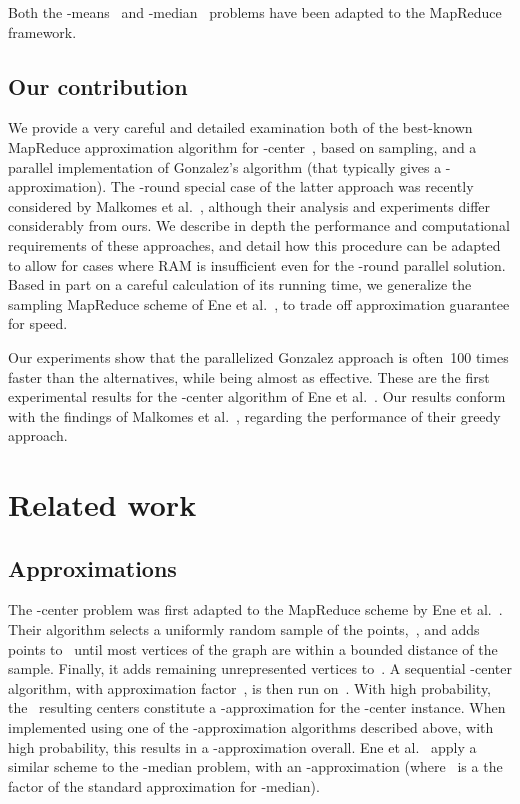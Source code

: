 \documentclass[11pt]{article}
\begin{document}
Both the -means~\cite{bahmani2012scalable} and -median~\cite{ene2011fast} problems have been adapted to the MapReduce framework.


\subsection{Our contribution}
We provide a very careful and detailed examination both of the best-known
MapReduce approximation algorithm for -center~\cite{ene2011fast}, based on
sampling,
and a parallel implementation of Gonzalez's algorithm (that typically gives a
-approximation).
The -round special case of the latter approach was recently considered by Malkomes et
al.~\cite{malkomes2015fast}, although their analysis and experiments differ
considerably from ours.
We describe in depth the performance and computational requirements of these
approaches, and detail how this procedure can be adapted to allow for cases where RAM is insufficient even for the -round parallel solution.
Based in part on a careful calculation of its running time,
we generalize the sampling MapReduce scheme of Ene et al.~\cite{ene2011fast},
to trade off approximation guarantee for speed.

Our experiments show that the parallelized Gonzalez approach is often~100 times faster than the alternatives, while being almost as effective.
These are the first experimental results for the -center algorithm of Ene et al.~\cite{ene2011fast}.
Our results conform with the findings of Malkomes et
al.~\cite{malkomes2015fast}, regarding the performance of their greedy approach.


\section{Related work}

\subsection{Approximations}
The -center problem was first adapted to the MapReduce scheme
by Ene et al.~\cite{ene2011fast}.
Their algorithm selects a uniformly random sample of the points,~, and
adds points to~ until most vertices of the graph are
within a bounded distance of the sample.
Finally, it adds remaining unrepresented vertices to~. 
A sequential -center algorithm, with approximation factor~,
is then run on~.
With high probability,
the~ resulting centers constitute
a -approximation for the -center instance.
When implemented using one of the -approximation algorithms described
above, with high probability, this results in a -approximation overall. 
Ene et al.~\cite{ene2011fast} apply a similar scheme to the -median
problem, with an -approximation (where~ is a the factor
of the standard approximation for -median).
\end{document}
